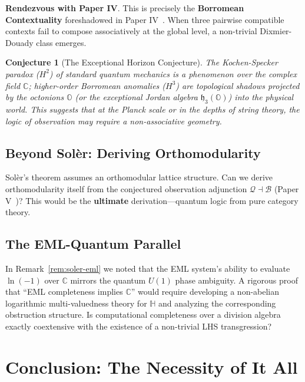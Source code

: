 \documentclass[11pt]{article}
\newtheorem{conjecture}[theorem]{Conjecture}
\begin{document}
\textbf{Rendezvous with Paper IV}.
This is precisely the \textbf{Borromean Contextuality} foreshadowed in Paper IV~\cite{PaperIV}. When three pairwise compatible contexts fail to compose associatively at the global level, a non-trivial Dixmier-Douady class emerges.

\begin{conjecture}[The Exceptional Horizon Conjecture]\label{conj:exceptional-horizon}
The Kochen-Specker paradox ($H^2$) of standard quantum mechanics is a phenomenon over the complex field $\mathbb{C}$; higher-order Borromean anomalies ($H^3$) are topological shadows projected by the octonions $\mathbb{O}$ (or the exceptional Jordan algebra $\mathfrak{h}_3(\mathbb{O})$) into the physical world. This suggests that at the Planck scale or in the depths of string theory, the logic of observation may require a non-associative geometry.
\end{conjecture}

\subsection{Beyond Sol\`{e}r: Deriving Orthomodularity}
\label{beyond-soler}

Sol\`{e}r's theorem assumes an orthomodular lattice structure. Can we derive orthomodularity itself from the conjectured observation adjunction $\mathcal{Q} \dashv \mathcal{B}$ (Paper V~\cite{PaperV})? This would be the \textbf{ultimate} derivation---quantum logic from pure category theory.

\subsection{The EML-Quantum Parallel}
\label{eml-open-question}

In Remark~\ref{rem:soler-eml} we noted that the EML system's ability to evaluate $\ln(-1)$ over $\mathbb{C}$ mirrors the quantum $U(1)$ phase ambiguity. A rigorous proof that ``EML completeness implies $\mathbb{C}$'' would require developing a non-abelian logarithmic multi-valuedness theory for $\mathbb{H}$ and analyzing the corresponding obstruction structure. Is computational completeness over a division algebra exactly coextensive with the existence of a non-trivial LHS transgression?

\section{Conclusion: The Necessity of It All}
\label{conclusion}
\end{document}
